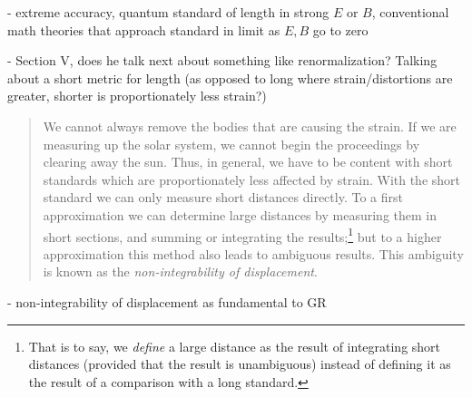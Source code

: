 - extreme accuracy, quantum standard of length in strong $E$ or $B$, conventional math theories that approach standard in limit as $E, B$ go to zero

- Section V, does he talk next about something like renormalization?  Talking about a short metric for length (as opposed to long where strain/distortions are greater, shorter is proportionately less strain?)

\begin{quote}
    We cannot always remove the bodies that are causing the strain.  If we are measuring up the solar system, we cannot begin the proceedings by clearing away the sun.  Thus, in general, we have to be content with short standards which are proportionately less affected by strain.  With the short standard we can only measure short distances directly.  To a first approximation we can determine large distances by measuring them in short sections, and summing or integrating the results;\footnote{That is to say, we \emph{define} a large distance as the result of integrating short distances (provided that the result is unambiguous) instead of defining it as the result of a comparison with a long standard.} but to a higher approximation this method also leads to ambiguous results.  This ambiguity is known as the \emph{non-integrability of displacement}.  \citep[p. 82]{Eddington1939}
\end{quote}


- non-integrability of displacement as fundamental to GR

